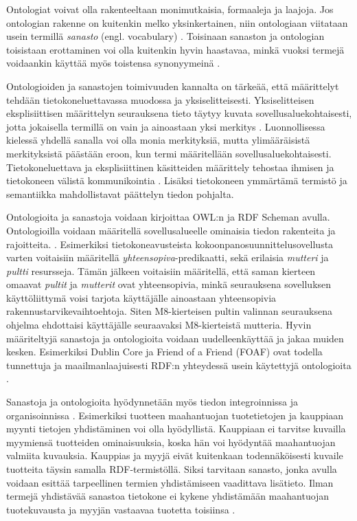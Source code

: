 \documentclass[finnish, 12pt, a4paper, elec, utf8, pdfa, online]{aaltothesis}
\begin{document}
{Ontologiat voivat olla rakenteeltaan monimutkaisia, formaaleja ja laajoja. Jos ontologian rakenne on kuitenkin melko yksinkertainen, niin ontologiaan viitataan usein termillä \textit{sanasto} (engl. vocabulary) \cite{vocabulary}. Toisinaan sanaston ja ontologian toisistaan erottaminen voi olla kuitenkin hyvin haastavaa, minkä vuoksi termejä voidaankin käyttää myös toistensa synonyymeinä \cite{vocabulary}.

Ontologioiden ja sanastojen toimivuuden kannalta on tärkeää, että määrittelyt tehdään tietokoneluettavassa muodossa ja yksiselitteisesti. Yksiselitteisen eksplisiittisen määrittelyn seurauksena tieto täytyy kuvata sovellusaluekohtaisesti, jotta jokaisella termillä on vain ja ainoastaan yksi merkitys \cite{RDF_specification}. Luonnollisessa kielessä yhdellä sanalla voi olla monia merkityksiä, mutta ylimääräisistä merkityksistä päästään eroon, kun termi määritellään sovellusaluekohtaisesti. Tietokoneluettava ja eksplisiittinen käsitteiden määrittely tehostaa ihmisen ja tietokoneen välistä kommunikointia \cite{ontology_learning}. Lisäksi tietokoneen ymmärtämä termistö ja semantiikka mahdollistavat päättelyn tiedon pohjalta.

Ontologioita ja sanastoja voidaan kirjoittaa OWL:n ja RDF Scheman avulla. Ontologioilla voidaan määritellä sovellusalueelle ominaisia tiedon rakenteita ja rajoitteita. \cite{vocabulary}. Esimerkiksi tietokoneavusteista kokoonpanosuunnittelusovellusta varten voitaisiin määritellä \textit{yhteensopiva}-predikaatti, sekä erilaisia \textit{mutteri} ja \textit{pultti} resursseja. Tämän jälkeen voitaisiin määritellä, että saman kierteen omaavat \textit{pultit} ja \textit{mutterit} ovat yhteensopivia, minkä seurauksena sovelluksen käyttöliittymä voisi tarjota käyttäjälle ainoastaan yhteensopivia rakennustarvikevaihtoehtoja. Siten M8-kierteisen pultin valinnan seurauksena ohjelma ehdottaisi käyttäjälle seuraavaksi M8-kierteistä mutteria. Hyvin määriteltyjä sanastoja ja ontologioita voidaan uudelleenkäyttää ja jakaa muiden kesken. Esimerkiksi Dublin Core ja Friend of a Friend (FOAF) ovat todella tunnettuja ja maailmanlaajuisesti RDF:n yhteydessä usein käytettyjä ontologioita \cite{data_namespace}.

Sanastoja ja ontologioita hyödynnetään myös tiedon integroinnissa ja organisoinnissa \cite{vocabulary}. Esimerkiksi tuotteen maahantuojan tuotetietojen ja kauppiaan myynti tietojen yhdistäminen voi olla hyödyllistä. Kauppiaan ei tarvitse kuvailla myymiensä tuotteiden ominaisuuksia, koska hän voi hyödyntää maahantuojan valmiita kuvauksia. Kauppias ja myyjä eivät kuitenkaan todennäköisesti kuvaile tuotteita täysin samalla RDF-termistöllä. Siksi tarvitaan sanasto, jonka avulla voidaan esittää tarpeellinen termien yhdistämiseen vaadittava lisätieto. Ilman termejä yhdistävää sanastoa tietokone ei kykene yhdistämään maahantuojan tuotekuvausta ja myyjän vastaavaa tuotetta toisiinsa \cite{vocabulary}.


}
\end{document}
